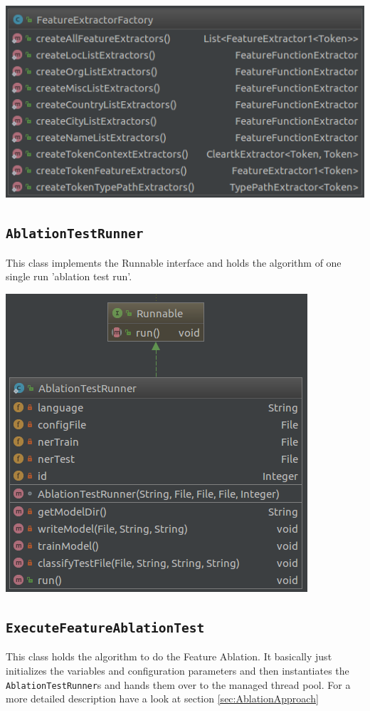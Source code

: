 \documentclass[11pt, english]{article}
\begin{document}
\includegraphics[scale=0.5]{gfx/FeatureExtractorFactory.png}
\label{fig:FeatureExtractorFactory}

\subsection{\texttt{AblationTestRunner}}
\label{sec:AblationTestRunner}
This class implements the Runnable interface and holds the algorithm of one single run 'ablation test run'. %

\includegraphics[scale=0.5]{gfx/AblationTestRunner.png}
\label{fig:AblationTestRunner}

\subsection{\texttt{ExecuteFeatureAblationTest}}
\label{sec:ExecuteFeatureAblationTest}
This class holds the algorithm to do the Feature Ablation. It basically just initializes the variables and configuration parameters and then instantiates the \verb/AblationTestRunner/s and hands them over to the managed thread pool. For a more detailed description have a look at section \ref{sec:AblationApproach}
\end{document}
